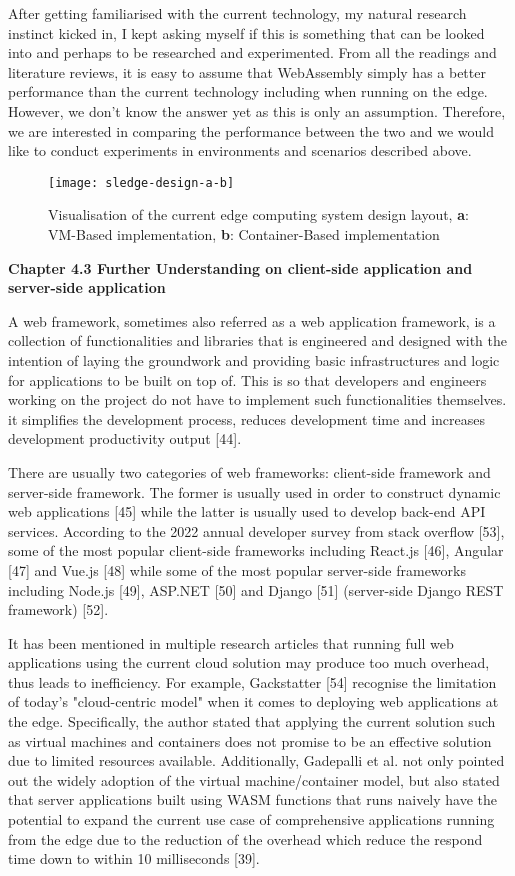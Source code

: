 After getting familiarised with the current technology, my natural research instinct kicked in, I kept asking myself if this is something that can be looked into and perhaps to be researched and experimented. From all the readings and literature reviews, it is easy to assume that WebAssembly simply has a better performance than the current technology including when running on the edge. However, we don't know the answer yet as this is only an assumption. Therefore, we are interested in comparing the performance between the two and we would like to conduct experiments in environments and scenarios described above.

\newpage
\begin{figure}[hp]
\centering
\texttt{[image: sledge-design-a-b]}
\caption{\footnotesize{Visualisation of the current edge computing system design layout, \textbf{a}: VM-Based implementation, \textbf{b}: Container-Based implementation}}
\captionsetup{aboveskip=0pt,font=it}
\end{figure}
\bigskip

\textbf{{\Large Chapter 4.3 Further Understanding on client-side application and server-side application}}

A web framework, sometimes also referred as a web application framework, is a collection of functionalities and libraries that is engineered and designed with the intention of laying the groundwork and providing basic infrastructures and logic for applications to be built on top of. This is so that developers and engineers working on the project do not have to implement such functionalities themselves. it simplifies the development process, reduces development time and increases development productivity output [44].

There are usually two categories of web frameworks: client-side framework and server-side framework. The former is usually used in order to construct dynamic web applications [45] while the latter is usually used to develop back-end API services. According to the 2022 annual developer survey from stack overflow [53], some of the most popular client-side frameworks including React.js [46], Angular [47] and Vue.js [48] while some of the most popular server-side frameworks including Node.js [49], ASP.NET [50] and Django [51] (server-side Django REST framework) [52].

It has been mentioned in multiple research articles that running full web applications using the current cloud solution may produce too much overhead, thus leads to inefficiency. For example, Gackstatter [54] recognise the limitation of today's "cloud-centric model" when it comes to deploying web applications at the edge. Specifically, the author stated that applying the current solution such as virtual machines and containers does not promise to be an effective solution due to limited resources available. Additionally, Gadepalli et al. not only pointed out the widely adoption of the virtual machine/container model, but also stated that server applications built using WASM functions that runs naively have the potential to expand the current use case of comprehensive applications running from the edge due to the reduction of the overhead which reduce the respond time down to within 10 milliseconds [39].

